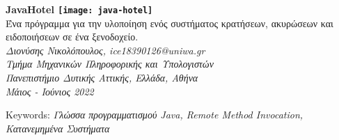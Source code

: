 \thispagestyle{empty}
\begin{center}
    \Huge{
        \textbf{
            \color{red}
            JavaHotel
            \texttt{[image: java-hotel]}
            \color{black}
            \vspace{5mm}
        }
    }
    \\
    \large{
        Ένα πρόγραμμα για την υλοποίηση ενός συστήματος κρατήσεων, ακυρώσεων
        και ειδοποιήσεων σε ένα ξενοδοχείο.
    }
    \vspace{5mm}\\
    \small{\emph{
    Διονύσης Νικολόπουλος, ice18390126@uniwa.gr
    \\
    Τμήμα Μηχανικών Πληροφορικής και Υπολογιστών
    \\
    Πανεπιστήμιο Δυτικής Αττικής, Ελλάδα, Αθήνα
    \\
    Μάιος - Ιούνιος 2022
    \\
    }}
    \vspace*{5mm}
\end{center}
\footnotesize
Keywords:
\emph{Γλώσσα προγραμματισμού Java, Remote Method Invocation, Κατανεμημένα
Συστήματα}
\normalsize


